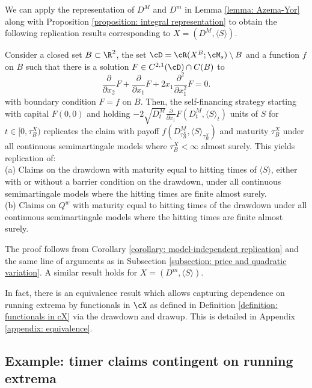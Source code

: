 \documentclass[11pt]{article}
\begin{document}
We can apply the representation of $D^M$ and $D^m$ in Lemma \ref{lemma: Azema-Yor} along with Proposition \ref{proposition: integral representation} to obtain the following replication results corresponding to $X = (D^M, \langle S \rangle)$.

\begin{corollary}
\label{corollary: claims on square drawdown and realised variance}
Consider a closed set $B \subset \R^2$, the set $\cD = \cR(X^B; \cM_s) \setminus B$ and a function $f$ on $B$ such that there is a solution $F \in C^{2,1}(\cD) \cap C(B)$ to
\begin{equation}
\label{drawdown PDE}
\frac{\partial}{\partial x_2} F + \frac{\partial}{\partial x_1} F + 2 x_1 \frac{\partial^2}{\partial x_1^2} F = 0.
\end{equation}
with boundary condition $F = f$ on $B$. Then, the self-financing strategy starting with capital $F(0,0)$ and holding $- 2 \sqrt{D^M_t} \frac{\partial}{\partial x_1} F(D^M_t, \langle S \rangle_t)$ units of $S$ for $t \in [0,\tau^X_B)$ replicates the claim with payoff $f( D^M_{\tau^X_B}, \langle S \rangle_{\tau^X_B} )$ and maturity $\tau^X_B$ under all continuous semimartingale models where $\tau^X_B < \infty$ almost surely. This yields replication of: \\
(a) Claims on the drawdown with maturity equal to hitting times of $\langle S \rangle$, either with or without a barrier condition on the drawdown, under all continuous semimartingale models where the hitting times are finite almost surely.  \\
(b) Claims on $Q^w$ with maturity equal to hitting times of the drawdown under all continuous semimartingale models where the hitting times are finite almost surely.

\end{corollary}

The proof follows from Corollary \ref{corollary: model-independent replication} and the same line of arguments as in Subsection \ref{subsection: price and quadratic variation}. A similar result holds for $X = (D^m, \langle S \rangle)$.

In fact, there is an equivalence result which allows capturing dependence on running extrema by functionals in $\cX$ as defined in Definition \ref{definition: functionals in cX} via the drawdown and drawup. This is detailed in Appendix \ref{appendix: equivalence}.

\subsection{Example: timer claims contingent on running extrema}
\end{document}
